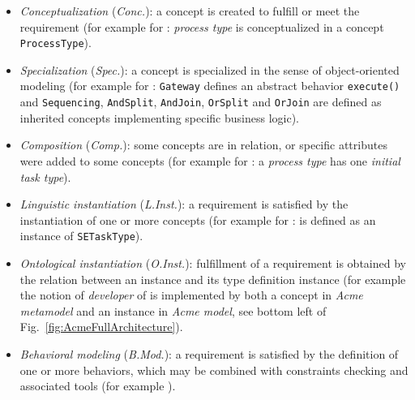 \begin{itemize}
    \item \emph{Conceptualization} (\textit{Conc.}): a concept is created to
      fulfill or meet the requirement (for example for :
      \textit{process type} is conceptualized in a concept
    \texttt{ProcessType}).

    \item \emph{Specialization} (\textit{Spec.}): a concept is specialized in
      the sense of object-oriented modeling (for example for :
      \texttt{Gateway} defines an abstract behavior \texttt{execute()} and
    \texttt{Sequencing}, \texttt{AndSplit}, \texttt{AndJoin}, \texttt{OrSplit}
  and \texttt{OrJoin} are defined as inherited concepts implementing specific
business logic).

    \item \emph{Composition} (\textit{Comp.}): some concepts are in relation,
      or specific attributes were added to some concepts (for example for
      : a \textit{process type} has one \textit{initial task type}).

    \item \emph{Linguistic instantiation} (\textit{L.Inst.}): a requirement is
      satisfied by the instantiation of one or more concepts (for example for
      :  is defined as an instance of
    \texttt{SETaskType}).

    \item \emph{Ontological instantiation} (\textit{O.Inst.}): fulfillment of a
      requirement is obtained by the relation between an instance and its type
      definition instance (for example the notion of \textit{developer} of
       is implemented by both a concept in \textit{Acme metamodel}
    and an instance in \textit{Acme model}, see bottom left of
  Fig.~\ref{fig:AcmeFullArchitecture}).

    \item \emph{Behavioral modeling} (\textit{B.Mod.}): a requirement is
  satisfied by the definition of one or more behaviors, which may be combined
  with constraints checking and associated tools (for example ).
  \end{itemize}




